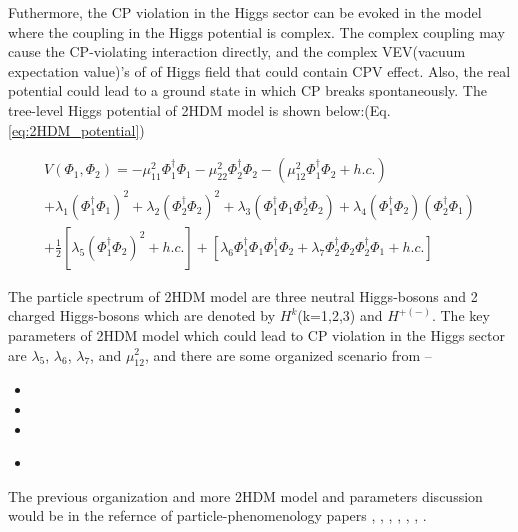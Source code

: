 			Futhermore, the CP violation in the Higgs sector can be evoked in the model where the coupling in the Higgs potential is complex. The complex coupling may cause the CP-violating interaction directly, and the complex VEV(vacuum expectation value)'s of of Higgs field that could contain CPV effect. Also, the real potential could lead to a ground state in which CP breaks spontaneously. The tree-level Higgs potential of 2HDM model is shown below:(Eq.\ref{eq:2HDM_potential})

			\begin{equation}
			\begin{split}
			V(\Phi_1, \Phi_2) = -\mu^2_{11} \Phi^{\dagger}_{1}\Phi_{1} -\mu^2_{22} \Phi^{\dagger}_{2}\Phi_{2} - ( \mu^2_{12} \Phi^{\dagger}_{1}\Phi_{2} + h.c.) \\
			+ \lambda_1(\Phi^{\dagger}_{1}\Phi_{1})^2 + \lambda_2(\Phi^{\dagger}_{2}\Phi_{2})^2 + \lambda_3(\Phi^{\dagger}_{1}\Phi_{1}\Phi^{\dagger}_{2}\Phi_{2}) + \lambda_4(\Phi^{\dagger}_{1}\Phi_{2})(\Phi^{\dagger}_{2}\Phi_{1})\\
			+ \frac{1}{2}[\lambda_5(\Phi^{\dagger}_{1}\Phi_{2})^2 + h.c. ] + [ \lambda_6 \Phi^{\dagger}_{1}\Phi_{1}\Phi^{\dagger}_{1}\Phi_{2} + \lambda_7 \Phi^{\dagger}_{2}\Phi_{2}\Phi^{\dagger}_{2}\Phi_{1} + h.c.]
			\label{eq:2HDM_potential}
			\end{split}
			\end{equation}
			\FloatBarrier

			The particle spectrum of 2HDM model are three neutral Higgs-bosons and 2 charged Higgs-bosons which are denoted by $H^{k}$(k=1,2,3) and $H^{+(-)}$. The key parameters of 2HDM model which could lead to CP violation in the Higgs sector are $\lambda_5$, $\lambda_6$, $\lambda_7$, and $\mu_{12}^2$, and there are some organized scenario from \cite{Atwood:2000tu} --

			\begin{itemize}
				\item 
				\item
				\item
				\item
			\label{AcpModelObs:itm:4_sce_of_2HDM}
			\end{itemize}

			The previous organization and more 2HDM model and parameters discussion would be in the refernce of particle-phenomenology papers \cite{Atwood:2000tu}, \cite{ElKaffas:2006gdt}, \cite{Khater:2003wq}, \cite{Keus:2015hva}, \cite{Iguro:2019zlc}, \cite{Bernreuther:1993hq}, \cite{Bernreuther:1998qv}.

